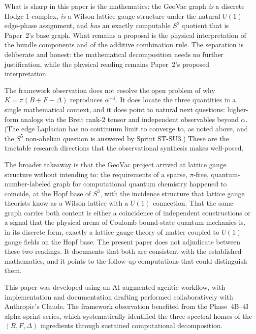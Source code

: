 \documentclass[aps,pra,twocolumn,superscriptaddress,longbibliography]{revtex4-2}
\begin{document}
What is sharp in this paper is the mathematics: the GeoVac graph
\emph{is} a discrete Hodge 1-complex, \emph{is} a Wilson lattice
gauge structure under the natural $U(1)$ edge-phase assignment, and
\emph{has} an exactly computable $S^2$ quotient that is Paper~2's
base graph.  What remains a proposal is the physical interpretation of
the bundle components and of the additive combination rule.  The
separation is deliberate and honest: the mathematical decomposition
needs no further justification, while the physical reading remains
Paper~2's proposed interpretation.

The framework observation does not resolve the open problem of why
$K = \pi(B + F - \Delta)$ reproduces $\alpha^{-1}$.  It does locate
the three quantities in a single mathematical context, and it does
point to natural next questions: higher-form analogs via the Breit
rank-2 tensor and independent observables beyond $\alpha$.  (The edge
Laplacian has no continuum limit to converge to, as noted above, and
the $S^5$ non-abelian question is answered by Sprint ST-SU3.)  These are the tractable
research directions that the observational synthesis makes
well-posed.

The broader takeaway is that the GeoVac project arrived at
lattice gauge structure without intending to: the requirements of a
sparse, $\pi$-free, quantum-number-labeled graph for computational
quantum chemistry happened to coincide, at the Hopf base of $S^3$,
with the incidence structure that lattice gauge theorists know as a
Wilson lattice with a $U(1)$ connection.  That the same graph
carries both content is either a coincidence of independent
constructions or a signal that the physical arena of Coulomb
bound-state quantum mechanics is, in its discrete form, exactly a
lattice gauge theory of matter coupled to $U(1)$ gauge fields on
the Hopf base.  The present paper does not adjudicate between these
two readings.  It documents that both are consistent with the
established mathematics, and it points to the follow-up computations
that could distinguish them.


\begin{acknowledgments}
This paper was developed using an AI-augmented agentic workflow, with
implementation and documentation drafting performed collaboratively
with Anthropic's Claude.  The framework observation benefited from
the Phase~4B--4I alpha-sprint series, which systematically identified
the three spectral homes of the $(B, F, \Delta)$ ingredients through
sustained computational decomposition.
\end{acknowledgments}
\end{document}
